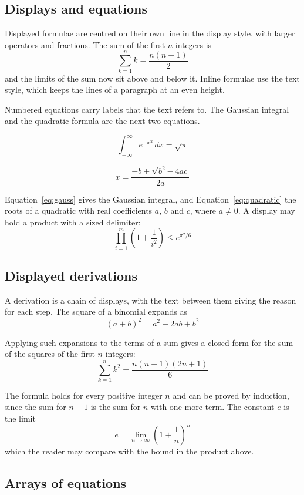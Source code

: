 \documentclass{article}
\numberwithin{equation}{section}
\theoremstyle{definition}
\theoremstyle{remark}
\begin{document}
\subsection{Displays and equations}

Displayed formulae are centred on their own line in the display style, with larger
operators and fractions. The sum of the first $n$ integers is
\[
  \sum_{k=1}^{n} k = \frac{n(n+1)}{2}
\]
and the limits of the sum now sit above and below it. Inline formulae use the text
style, which keeps the lines of a paragraph at an even height.

Numbered equations carry labels that the text refers to. The Gaussian integral and the
quadratic formula are the next two equations.

\begin{equation}\label{eq:gauss}
  \int_{-\infty}^{\infty} e^{-x^{2}}\,dx = \sqrt{\pi}
\end{equation}

\begin{equation}\label{eq:quadratic}
  x = \frac{-b \pm \sqrt{b^{2}-4ac}}{2a}
\end{equation}

Equation~\ref{eq:gauss} gives the Gaussian integral, and Equation~\ref{eq:quadratic} the
roots of a quadratic with real coefficients $a$, $b$ and $c$, where $a \neq 0$. A
display may hold a product with a sized delimiter:
\[
  \prod_{i=1}^{m} \left( 1 + \frac{1}{i^{2}} \right) \leq e^{\pi^{2}/6}
\]

\subsection{Displayed derivations}

A derivation is a chain of displays, with the text between them giving the reason for
each step. The square of a binomial expands as
\[
  (a+b)^{2} = a^{2} + 2ab + b^{2}
\]

Applying such expansions to the terms of a sum gives a closed form for the sum of the
squares of the first $n$ integers:
\[
  \sum_{k=1}^{n} k^{2} = \frac{n(n+1)(2n+1)}{6}
\]

The formula holds for every positive integer $n$ and can be proved by induction, since
the sum for $n+1$ is the sum for $n$ with one more term. The constant $e$ is the limit
\[
  e = \lim_{n\to\infty} \left( 1 + \frac{1}{n} \right)^{n}
\]
which the reader may compare with the bound in the product above.

\subsection{Arrays of equations}\label{sec:eqnarray}
\end{document}
